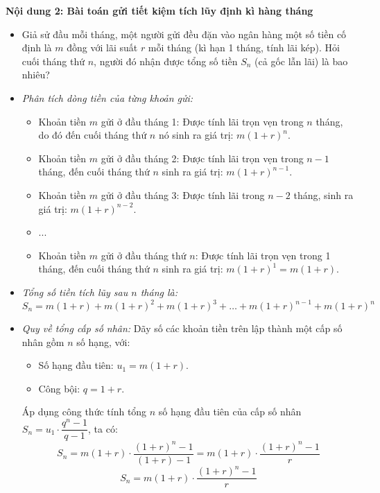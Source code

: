 \documentclass[12pt, a4paper]{article}
\begin{document}
\noindent \textbf{Nội dung 2: Bài toán gửi tiết kiệm tích lũy định kì hàng tháng}
\begin{itemize}
    \item Giả sử đầu mỗi tháng, một người gửi đều đặn vào ngân hàng một số tiền cố định là $m$ đồng với lãi suất $r$ mỗi tháng (kì hạn 1 tháng, tính lãi kép). Hỏi cuối tháng thứ $n$, người đó nhận được tổng số tiền $S_n$ (cả gốc lẫn lãi) là bao nhiêu?
    \item \textit{Phân tích dòng tiền của từng khoản gửi:}
    \begin{itemize}
        \item Khoản tiền $m$ gửi ở đầu tháng 1: Được tính lãi trọn vẹn trong $n$ tháng, do đó đến cuối tháng thứ $n$ nó sinh ra giá trị: $m(1+r)^n$.
        \item Khoản tiền $m$ gửi ở đầu tháng 2: Được tính lãi trọn vẹn trong $n-1$ tháng, đến cuối tháng thứ $n$ sinh ra giá trị: $m(1+r)^{n-1}$.
        \item Khoản tiền $m$ gửi ở đầu tháng 3: Được tính lãi trong $n-2$ tháng, sinh ra giá trị: $m(1+r)^{n-2}$.
        \item ...
        \item Khoản tiền $m$ gửi ở đầu tháng thứ $n$: Được tính lãi trọn vẹn trong 1 tháng, đến cuối tháng thứ $n$ sinh ra giá trị: $m(1+r)^1 = m(1+r)$.
    \end{itemize}
    \item \textit{Tổng số tiền tích lũy sau $n$ tháng là:}
    $$S_n = m(1+r) + m(1+r)^2 + m(1+r)^3 + \dots + m(1+r)^{n-1} + m(1+r)^n$$
    \item \textit{Quy về tổng cấp số nhân:}
    Dãy số các khoản tiền trên lập thành một cấp số nhân gồm $n$ số hạng, với:
    \begin{itemize}
        \item Số hạng đầu tiên: $u_1 = m(1+r)$.
        \item Công bội: $q = 1+r$.
    \end{itemize}
    Áp dụng công thức tính tổng $n$ số hạng đầu tiên của cấp số nhân $S_n = u_1 \cdot \dfrac{q^n - 1}{q - 1}$, ta có:
    $$S_n = m(1+r) \cdot \dfrac{(1+r)^n - 1}{(1+r) - 1} = m(1+r) \cdot \dfrac{(1+r)^n - 1}{r}$$
    \begin{equation}
        S_n = m(1+r) \cdot \dfrac{(1+r)^n - 1}{r}
    \end{equation}
\end{itemize}
\end{document}
